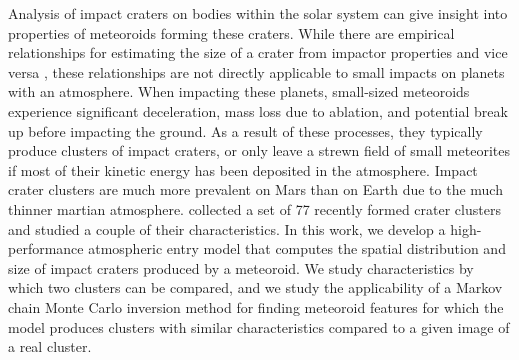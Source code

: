 Analysis of impact craters on bodies within the solar system can give insight into properties of meteoroids forming these craters.
While there are empirical relationships for estimating the size of a crater from impactor properties and vice versa \citep[e.g.][]{holsapple1987scaling}, these relationships are not directly applicable to small impacts on planets with an atmosphere.
When impacting these planets, small-sized meteoroids experience significant deceleration, mass loss due to ablation, and potential break up before impacting the ground.
As a result of these processes, they typically produce clusters of impact craters, or only leave a strewn field of small meteorites if most of their kinetic energy has been deposited in the atmosphere.
Impact crater clusters are much more prevalent on Mars than on Earth due to the much thinner martian atmosphere. \cite{daubar2019recently} collected a set of 77 recently formed crater clusters and studied a couple of their characteristics.
In this work, we develop a high-performance atmospheric entry model that computes the spatial distribution and size of impact craters produced by a meteoroid.
We study characteristics by which two clusters can be compared, and we study the applicability of a Markov chain Monte Carlo inversion method for finding meteoroid features for which the model produces clusters with similar characteristics compared to a given image of a real cluster.
